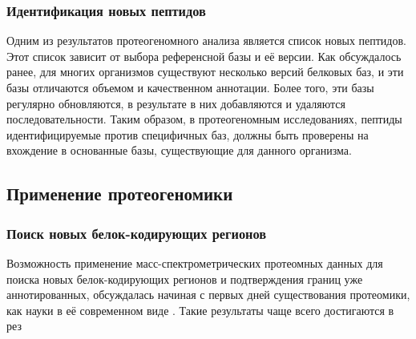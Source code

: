 \subsubsection{Идентификация новых пептидов}
Одним из результатов протеогеномного анализа является список новых пептидов. Этот список зависит от выбора референсной базы и её версии. Как обсуждалось ранее, для многих организмов существуют несколько версий белковых баз, и эти базы отличаются объемом и качественном аннотации. Более того, эти базы регулярно обновляются, в результате в них добавляются и удаляются последовательности. Таким образом, в протеогеномным исследованиях, пептиды идентифицируемые против специфичных баз, должны быть проверены на вхождение в основанные базы, существующие для данного организма.

\subsection{Применение протеогеномики}

\subsubsection{Поиск новых белок-кодирующих регионов}
Возможность применение масс-спектрометрических протеомных данных для поиска новых белок-кодирующих регионов и подтверждения границ уже аннотированных, обсуждалась начиная с первых дней существования протеомики, как науки в её современном виде \cite{choudhary2001interrogating, andersen2001mass}. Такие результаты чаще всего достигаются в рез

\newpage
